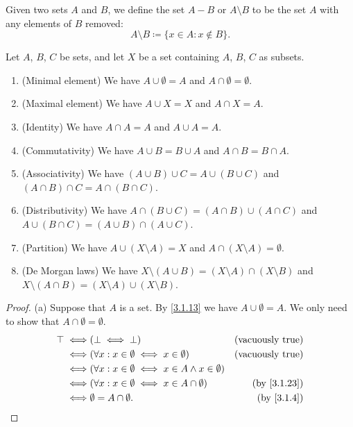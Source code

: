 \setcounter{theorem}{26}
\begin{definition}\label{3.1.27}
  Given two sets \(A\) and \(B\), we define the set \(A - B\) or \(A \setminus B\) to be the set \(A\) with any elements of \(B\) removed:
  \[
    A \setminus B \coloneqq \{x \in A : x \notin B\}.
  \]
\end{definition}

\begin{proposition}\label{3.1.28}
  Let \(A\), \(B\), \(C\) be sets, and let \(X\) be a set containing \(A\), \(B\), \(C\) as subsets.
  \begin{enumerate}
    \item (Minimal element) We have \(A \cup \emptyset = A\) and \(A \cap \emptyset = \emptyset\).
    \item (Maximal element) We have \(A \cup X = X\) and \(A \cap X = A\).
    \item (Identity) We have \(A \cap A = A\) and \(A \cup A = A\).
    \item (Commutativity) We have \(A \cup B = B \cup A\) and \(A \cap B = B \cap A\).
    \item (Associativity) We have \((A \cup B) \cup C = A \cup (B \cup C)\) and \((A \cap B) \cap C = A \cap (B \cap C)\).
    \item (Distributivity) We have \(A \cap (B \cup C) = (A \cap B) \cup (A \cap C)\) and \(A \cup (B \cap C) = (A \cup B) \cap (A \cup C)\).
    \item (Partition) We have \(A \cup (X \setminus A) = X\) and \(A \cap (X \setminus A) = \emptyset\).
    \item (De Morgan laws) We have \(X \setminus (A \cup B) = (X \setminus A) \cap (X \setminus B)\) and \(X \setminus (A \cap B) = (X \setminus A) \cup (X \setminus B)\).
  \end{enumerate}
\end{proposition}

\begin{proof}{(a)}
  Suppose that \(A\) is a set.
  By \cref{3.1.13} we have \(A \cup \emptyset = A\).
  We only need to show that \(A \cap \emptyset = \emptyset\).
  \begin{align*}
    \top \iff & (\bot \iff \bot)                                                 & \text{(vacuously true)}   \\
    \iff      & (\forall x : x \in \emptyset \iff x \in \emptyset)               & \text{(vacuously true)}   \\
    \iff      & (\forall x : x \in \emptyset \iff x \in A \land x \in \emptyset)                             \\
    \iff      & (\forall x : x \in \emptyset \iff x \in A \cap \emptyset)        & \text{(by \cref{3.1.23})} \\
    \iff      & \emptyset = A \cap \emptyset.                                    & \text{(by \cref{3.1.4})}
  \end{align*}
\end{proof}

